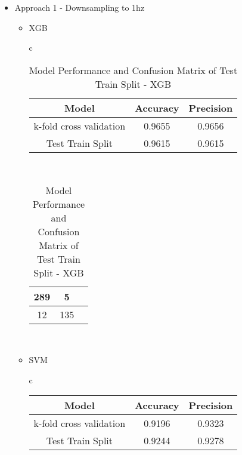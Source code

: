 \documentclass{article}
\begin{document}
\begin{itemize}
    \item Approach 1 - Downsampling to 1hz
\begin{itemize}
        \item XGB
            \begin{table}[htbp]
            \centering
            \begin{tabular}{c} %
                \begin{tabular}{|c|c|c|}
                \hline
                Model & Accuracy & Precision \\
                \hline
                k-fold cross validation & 0.9655 & 0.9656 \\
                \hline
                Test Train Split & 0.9615 & 0.9615 \\
                \hline
                \end{tabular}
                \vspace{5mm} \\ %
                
                \begin{tabular}{|c|c|c|}
                \hline
                289 & 5 \\
                \hline
                12 & 135 \\
                \hline
                \end{tabular} \\
            \end{tabular}
            \caption{Model Performance and Confusion Matrix of Test Train Split - XGB}
            \label{tab:combined_table}
            \end{table}

        \item SVM
            \begin{table}[htbp]
            \centering
            \begin{tabular}{c} %
                \begin{tabular}{|c|c|c|}
                \hline
                Model & Accuracy & Precision \\
                \hline
                k-fold cross validation & 0.9196 &  0.9323 \\
                \hline
                Test Train Split & 0.9244 & 0.9278 \\
                \hline
                \end{tabular}
                \vspace{5mm} \\ %
                

\end{tabular}
\end{table}
\end{itemize}
\end{itemize}
\end{document}
